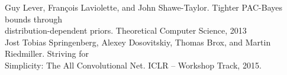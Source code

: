 \documentclass[A1,landscape]{poster}
\begin{document}
\begin{columns}
\begin{columns}
\begin{columns}
{  {\footnotesize Guy Lever, François Laviolette, and John Shawe-Taylor. Tighter PAC-Bayes bounds through}\\[-0.5cm]
  {\footnotesize distribution-dependent priors. Theoretical Computer Science, 2013}\\[-1.8cm]

  {\footnotesize Jost Tobias Springenberg, Alexey Dosovitskiy, Thomas Brox, and Martin Riedmiller. Striving for}\\[-0.5cm]
  {\footnotesize Simplicity: The All Convolutional Net. ICLR – Workshop Track, 2015.}

}

\end{columns}

\end{columns}

\end{columns}
\end{document}
